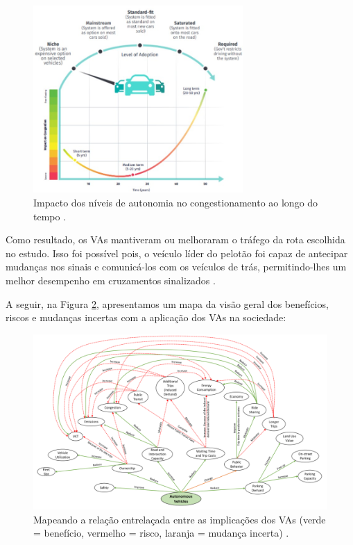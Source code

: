 \begin{figure}[H]
\centering
\includegraphics[width=8cm]{Figures/conge.jpg}
\caption{Impacto dos níveis de autonomia no congestionamento ao longo do tempo \cite{4cenarios_ocidental}.}
\label{congestionamento}
\end{figure}

Como resultado, os VAs mantiveram ou melhoraram o tráfego da rota escolhida no estudo. Isso foi possível pois, o veículo líder do pelotão foi capaz de antecipar mudanças nos sinais e comunicá-los com os veículos de trás, permitindo-lhes um melhor desempenho em cruzamentos sinalizados \cite{conge}.

A seguir, na Figura \ref{mapa_resumo}, apresentamos um mapa da visão geral dos benefícios, riscos e mudanças incertas com a aplicação dos VAs na sociedade:

\begin{figure}[H]
\centering
\includegraphics[width=16cm]{Figures/map.png}
\caption{Mapeando a relação entrelaçada entre as implicações dos VAs (verde = benefício, vermelho = risco, laranja = mudança incerta) \cite{mundobrasil}.}
\label{mapa_resumo}
\end{figure}


